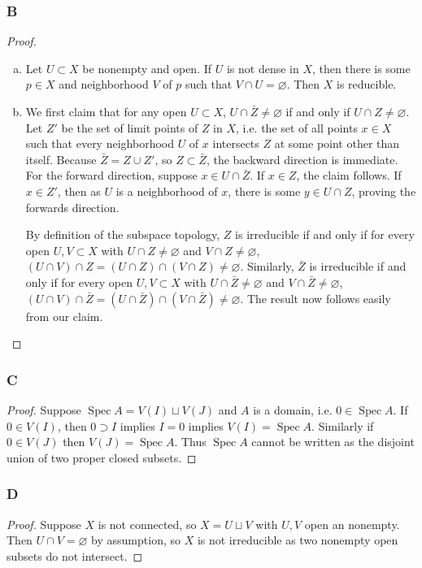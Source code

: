 \documentclass{article}
\DeclareMathOperator{\Spec}{\mathrm{Spec}}
\let\emptyset\varnothing
\theoremstyle{definition} %
\begin{document}
\subsubsection{B}\label{3.6.B}
\begin{proof}
    \begin{enumerate}[(a)]
        \item Let $U\subset X$ be nonempty and open. If $U$ is not dense in $X$, then there is some $p\in X$ and neighborhood $V$ of $p$ such that $V\cap U= \emptyset$. Then $X$ is reducible.
        \item We first claim that for any open $U\subset X$, $U\cap \bar Z \ne \emptyset$ if and only if $U\cap Z \ne \emptyset$. Let $Z'$ be the set of limit points of $Z$ in $X$, i.e. the set of all points $x\in X$ such that every neighborhood $U$ of $x$ intersects $Z$ at some point other than itself. Because $\bar Z = Z\cup Z'$, so $Z\subset \bar Z$, the backward direction is immediate. For the forward direction, suppose $x\in U\cap \bar Z$. If $x\in Z$, the claim follows. If $x\in Z'$, then as $U$ is a neighborhood of $x$, there is some $y\in U\cap Z$, proving the forwards direction.

        By definition of the subspace topology, $Z$ is irreducible if and only if for every open $U,V\subset X$ with $U\cap Z\ne \emptyset$ and $V\cap Z \ne \emptyset$, $(U\cap V)\cap Z =(U\cap Z) \cap (V\cap Z)  \ne \emptyset$. Similarly, $\bar Z$ is irreducible if and only if for every open $U,V\subset X$ with $U\cap \bar Z\ne \emptyset$ and $V\cap \bar Z \ne \emptyset$, $(U\cap V)\cap \bar Z =(U\cap \bar Z) \cap (V\cap \bar Z)  \ne \emptyset$. The result now follows easily from our claim.
    \end{enumerate}
\end{proof}
\subsubsection{C}\label{3.6.C}
\begin{proof}
    Suppose $\Spec A = V(I)\sqcup V(J)$ and $A$ is a domain, i.e. $0\in \Spec A$. If $0\in V(I)$, then $0\supset I$ implies $I=0$ implies $V(I)=\Spec A$. Similarly if $0\in V(J)$ then $V(J)=\Spec A$. Thus $\Spec A$ cannot be written as the disjoint union of two proper closed subsets.
\end{proof}
\subsubsection{D}\label{3.6.D}
\begin{proof}
    Suppose $X$ is not connected, so $X=U\sqcup V$ with $U,V$ open an nonempty. Then $U\cap V=\emptyset$ by assumption, so $X$ is not irreducible as two nonempty open subsets do not intersect.
\end{proof}
\end{document}
